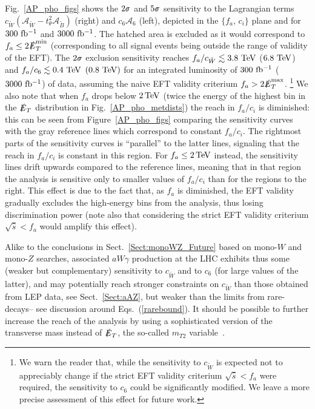 \documentclass[11pt]{article}
\newcommand{\Bsigma}{\mbox{$\hspace{0.12em}\shortmid\hspace{-0.62em}\sigma$}}
\newcommand{\Bt}{{\tilde{B}}}
\newcommand{\Wt}{{\tilde{W}}}
\newcommand{\ETmiss}{\slashed{E}_T}
\renewcommand{\[}{\begin{equation}}
\renewcommand{\]}{\end{equation}}
\begin{document}
Fig.~\ref{AP_pho_figs} shows the $2\Bsigma$ and $5\Bsigma$ sensitivity to the Lagrangian terms $c_\Wt\left( \mathcal{A}_\Wt-t_\theta^2 \mathcal{A}_\Bt \right)$ (right) 
and $c_6 \mathcal{A}_6$ (left), depicted in the $\{f_a,\,c_i\}$ plane and for $\unit[300]{\,fb^{-1}}$ and $\unit[3000]{\,fb^{-1}}$. 
The hatched area is excluded as it would correspond to $f_a \le 2\ETmiss^\mathrm{min}$ (corresponding to all signal events being outside the range 
of validity of the EFT).  
The $2\Bsigma$ exclusion sensitivity reaches $f_a / c_\Wt \lesssim \unit[3.8]{\,TeV}$ ($ \unit[6.8]{\,TeV}$) 
and $f_a / c_6 \lesssim \unit[0.4]{\,TeV}$ $(\unit[0.8]{\,TeV})$  for an integrated luminosity of $\unit[300]{\,fb^{-1}}$ ($\unit[3000]{\,fb^{-1}}$) of data, 
assuming the naive EFT validity criterium $f_a > 2 \ETmiss^\mathrm{max}$. \footnote{We warn the reader that, 
while the sensitivity to $c_\Wt$ is expected not to appreciably change 
if the strict EFT validity criterium $\sqrt{\hat{s}} < f_a$ were required, the sensitivity to $c_6$ 
could be significantly modified. We leave a more precise assessment of this effect for future work.}
We also note that when $f_a$ drops below $\unit[2]{TeV}$ (twice the energy of the highest bin in the $\ETmiss$ distribution in Fig.~\ref{AP_pho_metdists}) the 
reach in $f_a/c_i$ is diminished: this can be seen from Figure~\ref{AP_pho_figs} comparing the sensitivity curves with the gray reference 
lines which correspond to constant $f_a/c_i$. The rightmost parts of the sensitivity curves is ``parallel'' to the latter lines, signaling that 
the reach in $f_a/c_i$ is constant in this region. For $f_a\leq\unit[2]{TeV}$  instead, the sensitivity lines drift upwards compared to the reference lines, 
meaning that in that region the analysis is sensitive only to smaller values of $f_a/c_i$ than for the regions to the right. 
This effect is due to the fact that, as $f_a$ is diminished, the EFT validity gradually excludes the high-energy bins from the analysis, thus losing discrimination power
(note also that considering the strict EFT validity criterium $\sqrt{\hat{s}} < f_a$ would amplify this effect).
 
Alike to the conclusions in Sect.~\ref{Sect:monoWZ_Future} based on mono-$W$ and mono-$Z$ searches, associated $aW\gamma$ production at the LHC exhibits 
thus some (weaker but complementary) sensitivity to $c_{\tilde{W}}$ and to $c_6$ (for large values of the latter), and may potentially reach stronger 
constraints on $c_\Wt$ than those obtained from LEP data, see Sect.~\ref{Sect:aAZ}, but weaker than the limits from rare-decays-- see discussion 
around Eqs.~(\ref{rarebound}).
It should be possible to further increase the reach of the analysis
by using a sophisticated version of the transverse mass instead of $\ETmiss$, the so-called  $m_{T2}$ variable~\cite{Lester:1999tx,Barr:2003rg}. 
 
\end{document}
